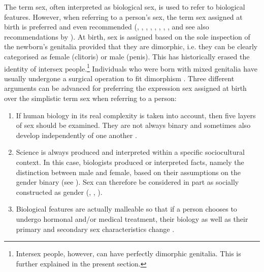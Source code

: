 The term sex, often interpreted as biological sex, is used to refer to biological features. However, when referring to a person's sex, the term sex assigned at birth is preferred and even recommended (\cite{fausto2012sex}, \cite*{fausto2018why}, \cite[24]{prona2016mein}, \cite[95]{richards2016non}, \cite{serano2017transgender}, \cite[30]{barker2018psychology}, \cite{lester2018trans}, \cite[57]{barker2019life}, and see also recommendations by \cite{apagenderenglish}). At birth, sex is assigned based on the sole inspection of the newborn's genitalia provided that they are dimorphic, i.e. they can be clearly categorised as female (clitoris) or male (penis). This has historically erased the identity of intersex people.\footnote{Intersex people, however, can have perfectly dimorphic genitalia. This is further explained in the present section.} Individuals who were born with mixed genitalia have usually undergone a surgical operation to fit dimorphism \citep{fausto2012sex,fausto2018why,fausto2020sexing,prona2016mein,richards2016non,barker2018rewriting,lester2018trans,barker2019life}. Three different arguments can be advanced for preferring the expression sex assigned at birth over the simplistic term sex when referring to a person:
\begin{enumerate}
\setlength\itemsep{-0.5em}
    \item If human biology in its real complexity is taken into account, then five layers of sex should be examined. They are not always binary and sometimes also develop independently of one another \citep{fausto1993five,fausto2000five,fausto2012sex,fausto2018why}.
    \item Science is always produced and interpreted within a specific sociocultural context. In this case, biologists produced or interpreted facts, namely the distinction between male and female, based on their assumptions on the gender binary (see \cite{sterling2020science}). Sex can therefore be considered in part as socially constructed as gender (\cite[10--11]{butler1990gender}, \cite[199]{fausto2016critiques}, \cite{serano2017transgender}).
    \item Biological features are actually malleable so that if a person chooses to undergo hormonal and/or medical treatment, their biology as well as their primary and secondary sex characteristics change \citep{serano2017transgender,lester2018trans}.
\end{enumerate}


